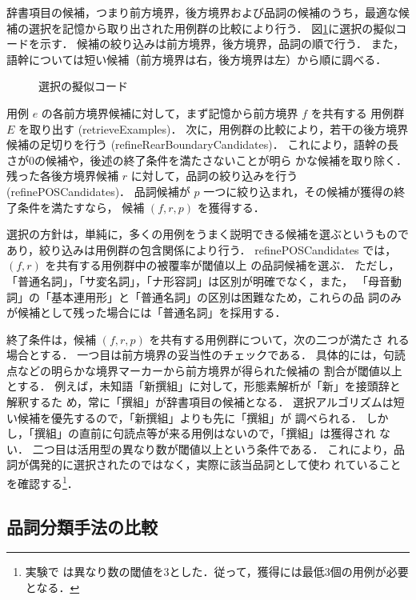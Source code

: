 \documentclass[japanese]{jnlp_1.4}
\begin{document}
辞書項目の候補，つまり前方境界，後方境界および品詞の候補のうち，最適な候
補の選択を記憶から取り出された用例群の比較により行う．
図\ref{fig:selection}に選択の擬似コードを示す．
候補の絞り込みは前方境界，後方境界，品詞の順で行う．
また，語幹については短い候補（前方境界は右，後方境界は左）から順に調べる．

\begin{figure}[b]

 \caption{選択の擬似コード}
 \label{fig:selection}
\end{figure}

用例 $e$ の各前方境界候補に対して，まず記憶から前方境界 $f$ を共有する
用例群 $E$ を取り出す (retrieveExamples)．
次に，用例群の比較により，若干の後方境界候補の足切りを行う
(refineRearBoundaryCandidates)．
これにより，語幹の長さが0の候補や，後述の終了条件を満たさないことが明ら
かな候補を取り除く．
残った各後方境界候補 $r$ に対して，品詞の絞り込みを行う
(refinePOSCandidates)．
品詞候補が $p$ 一つに絞り込まれ，その候補が獲得の終了条件を満たすなら，
候補 $(f, r, p)$ を獲得する．

選択の方針は，単純に，多くの用例をうまく説明できる候補を選ぶというもので
あり，絞り込みは用例群の包含関係により行う．
refinePOSCandidates では，$(f, r)$ を共有する用例群中の被覆率が閾値以上
の品詞候補を選ぶ．
ただし，「普通名詞」，「サ変名詞」，「ナ形容詞」は区別が明確でなく，また，
「母音動詞」の「基本連用形」と「普通名詞」の区別は困難なため，これらの品
詞のみが候補として残った場合には「普通名詞」を採用する．

終了条件は，候補 $(f, r, p)$ を共有する用例群について，次の二つが満たさ
れる場合とする．
一つ目は前方境界の妥当性のチェックである．
具体的には，句読点などの明らかな境界マーカーから前方境界が得られた候補の
割合が閾値以上とする．
例えば，未知語「新撰組」に対して，形態素解析が「新」を接頭辞と解釈するた
め，常に「撰組」が辞書項目の候補となる．
選択アルゴリズムは短い候補を優先するので，「新撰組」よりも先に「撰組」が
調べられる．
しかし，「撰組」の直前に句読点等が来る用例はないので，「撰組」は獲得され
ない．
二つ目は活用型の異なり数が閾値以上という条件である．
これにより，品詞が偶発的に選択されたのではなく，実際に該当品詞として使わ
れていることを確認する\footnote{実験で
は異なり数の閾値を3とした．従って，獲得には最低3個の用例が必要となる．}．


\subsection{品詞分類手法の比較} \label{sec:selection-comparison}
\end{document}

